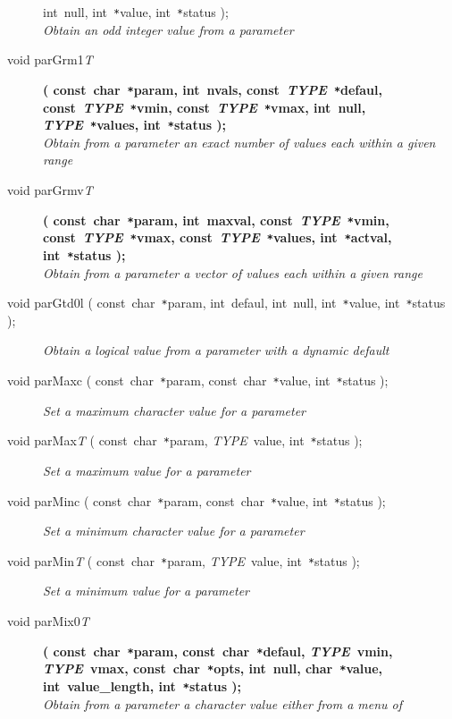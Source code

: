 \documentclass[twoside,11pt]{article}
\newcommand{\listline}{\hspace{1pt}\\}
\renewcommand{\listline}{}
\begin{document}
\begin{flushleft}
\begin{description}
{              int~null, int~\texttt{*}value, int~\texttt{*}status );} \\
\textit{Obtain an odd integer value from a parameter}
\item[void parGrm1\textit{T}]
\textbf{( const~char~\texttt{*}param, int~nvals,
               const~\textit{TYPE}~\texttt{*}defaul, 
               const~\textit{TYPE}~\texttt{*}vmin,
               const~\textit{TYPE}~\texttt{*}vmax, int~null,
               \textit{TYPE}~\texttt{*}values, int~\texttt{*}status );} \\
\textit{Obtain from a parameter an exact number of values each within a
            given range}
\item[void parGrmv\textit{T}]
\textbf{( const~char~\texttt{*}param, int~maxval,
               const~\textit{TYPE}~\texttt{*}vmin, 
               const~\textit{TYPE}~\texttt{*}vmax,
               const~\textit{TYPE}~\texttt{*}values, int~\texttt{*}actval,
               int~\texttt{*}status );} \\
\textit{Obtain from a parameter a vector of values each within a given
            range}
\item[void parGtd0l ( const~char~\texttt{*}param, int~defaul, int~null,
  int~\texttt{*}value, int~\texttt{*}status );] \listline
\textit{Obtain a logical value from a parameter with a dynamic default}
\item[void parMaxc ( const~char~\texttt{*}param, const~char~\texttt{*}value,
  int~\texttt{*}status );] \listline
\textit{Set a maximum character value for a parameter}
\item[void parMax\textit{T} ( const~char~\texttt{*}param, \textit{TYPE}~value,
  int~\texttt{*}status );] \listline
\textit{Set a maximum value for a parameter}
\item[void parMinc ( const~char~\texttt{*}param, const~char~\texttt{*}value,
  int~\texttt{*}status );] \listline
\textit{Set a minimum character value for a parameter}
\item[void parMin\textit{T} ( const~char~\texttt{*}param, \textit{TYPE}~value,
  int~\texttt{*}status );] \listline
\textit{Set a minimum value for a parameter}
\item[void parMix0\textit{T}]
\textbf{( const~char~\texttt{*}param, const~char~\texttt{*}defaul,
               \textit{TYPE}~vmin, \textit{TYPE}~vmax, 
               const~char~\texttt{*}opts, int~null, char~\texttt{*}value,
               int~value\_length, int~\texttt{*}status );} \\
\textit{Obtain from a parameter a character value either from a menu of
}
\end{description}
\end{flushleft}
\end{document}
